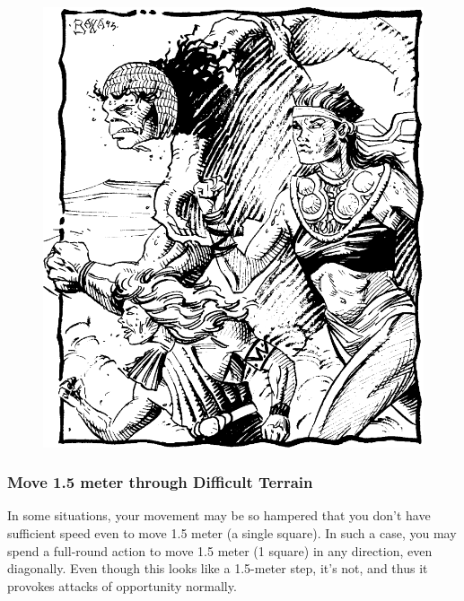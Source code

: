 
\begin{figure}[b!]
\centering
\includegraphics[width=\columnwidth]{images/running-1.png}
\WOTC
\end{figure}


\subsubsection{Move 1.5 meter through Difficult Terrain}
In some situations, your movement may be so hampered that you don't have sufficient speed even to move 1.5 meter (a single square). In such a case, you may spend a full-round action to move 1.5 meter (1 square) in any direction, even diagonally. Even though this looks like a 1.5-meter step, it's not, and thus it provokes attacks of opportunity normally.